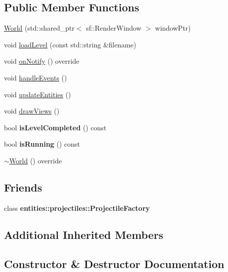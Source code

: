 \subsection*{Public Member Functions}
\begin{DoxyCompactItemize}
\item 
\hyperlink{classWorld_a96ca734b18df2cf85e666fc6d358e12c}{World} (std\+::shared\+\_\+ptr$<$ sf\+::\+Render\+Window $>$ window\+Ptr)
\item 
void \hyperlink{classWorld_a6a08c827c3a0def12b7700211353735f}{load\+Level} (const std\+::string \&filename)
\item 
void \hyperlink{classWorld_a91c2d7b127190f17a6cd85743245fb5b}{on\+Notify} () override
\item 
void \hyperlink{classWorld_ad37fe32cce284282361b9e7397b27a23}{handle\+Events} ()
\item 
void \hyperlink{classWorld_a5cc73b1aa54db5da01e4004acd4fd8bb}{update\+Entities} ()
\item 
void \hyperlink{classWorld_a8e8ad60668f8fe975f03bcb612264bc4}{draw\+Views} ()
\item 
\mbox{\label{classWorld_a89826be651c0ea4c8965403cd0b8138c}} 
bool {\bfseries is\+Level\+Completed} () const
\item 
\mbox{\label{classWorld_a6ec812e86ad7813ff1a2c92ea6d85824}} 
bool {\bfseries is\+Running} () const
\item 
\hyperlink{classWorld_adf5e8724afb4d083e566ee4e48905bf2}{$\sim$\+World} () override
\end{DoxyCompactItemize}
\subsection*{Friends}
\begin{DoxyCompactItemize}
\item 
\mbox{\label{classWorld_a59d0171925be26338b8e5665e281cc97}} 
class {\bfseries entities\+::projectiles\+::\+Projectile\+Factory}
\end{DoxyCompactItemize}
\subsection*{Additional Inherited Members}


\subsection{Constructor \& Destructor Documentation}
\mbox{\label{classWorld_a96ca734b18df2cf85e666fc6d358e12c}} 
